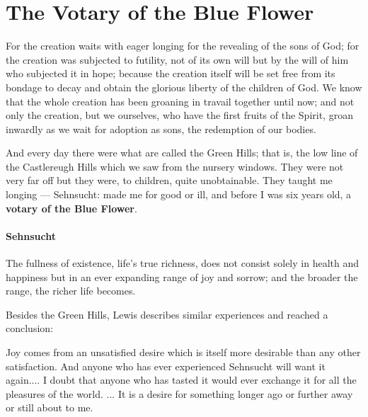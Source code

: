 \section{The Votary of the Blue Flower}

\begin{quotex}
For the creation waits with eager longing for the revealing of the sons of God; for the creation was subjected to futility, not of its own will but by the will of him who subjected it in hope; because the creation itself will be set free from its bondage to decay and obtain the glorious liberty of the children of God. We know that the whole creation has been groaning in travail together until now; and not only the creation, but we ourselves, who have the first fruits of the Spirit, groan inwardly as we wait for adoption as sons, the redemption of our bodies.

And every day there were what are called the Green Hills; that is, the low line of the Castlereugh Hills which we saw from the nursery windows. They were not very far off but they were, to children, quite unobtainable. They taught me longing --- Sehnsucht: made me for good or ill, and before I was six years old, a \textbf{votary of the Blue Flower}.
\end{quotex}


\paragraph{Sehnsucht}


\begin{quotex}
The fullness of existence, life's true richness, does not consist solely in health and happiness but in an ever expanding range of joy and sorrow; and the broader the range, the richer life becomes.
\end{quotex}


Besides the Green Hills, Lewis describes similar experiences and reached a conclusion:

\begin{quotex}
Joy comes from an unsatisfied desire which is itself more desirable than any other satisfaction. And anyone who has ever experienced Sehnsucht will want it again.... I doubt that anyone who has tasted it would ever exchange it for all the pleasures of the world. ... It is a desire for something longer ago or further away or still about to me.
\end{quotex}


